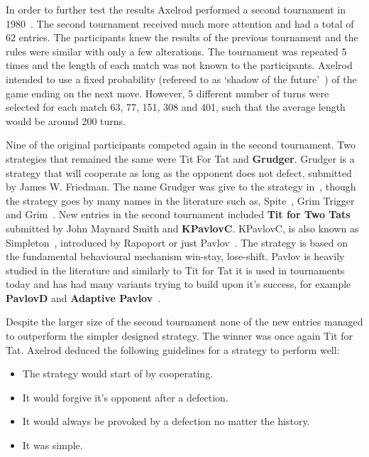 \documentclass{article}
\theoremstyle{definition}
\begin{document}
In order to further test the results Axelrod performed a second tournament
in 1980~\cite{Axelrod1980b}. The second tournament received much more attention
and had a total of 62 entries. The participants knew the results of the previous
tournament and the rules were similar with only a few alterations. The
tournament was repeated 5 times and the length of each match was not known to
the participants. Axelrod intended to use a fixed probability (refereed to as
`shadow of the future'~\cite{Axelrod1988}) of the game ending on the next move.
However, 5 different number of turns were selected for each match 63, 77, 151,
308 and 401, such that the average length would be around 200 turns.

Nine of the original participants competed again in the second tournament. Two
strategies that remained the same were Tit For Tat and \textbf{Grudger}. Grudger
is a strategy that will cooperate as long as the opponent does not defect,
submitted by James W. Friedman. The name Grudger was give to the strategy
in~\cite{Li2014}, though the strategy goes by many names in the literature such
as, Spite~\cite{Beaufils1997}, Grim Trigger~\cite{Banks1990} and
Grim~\cite{Van2015}. New entries in the second tournament included \textbf{Tit
for Two Tats} submitted by John Maynard Smith and \textbf{KPavlovC}. KPavlovC,
is also known as Simpleton~\cite{rapoport1965}, introduced by Rapoport or just
Pavlov~\cite{Nowak1993}. The strategy is based on the fundamental behavioural
mechanism win-stay, lose-shift. Pavlov is heavily studied in the literature and
similarly to Tit for Tat it is used in tournaments today and has
had many variants trying to build upon it's success, for example
\textbf{PavlovD} and \textbf{Adaptive Pavlov}~\cite{Li2007}.

Despite the larger size of the second tournament none of the new entries managed
to outperform the simpler designed strategy. The winner was once again Tit for
Tat. Axelrod deduced the following guidelines for a strategy to perform well:

\begin{itemize}
    \item The strategy would start of by cooperating.
    \item It would forgive it's opponent after a defection.
    \item It would always be provoked by a defection no matter the history.
    \item It was simple.
\end{itemize}
\end{document}
